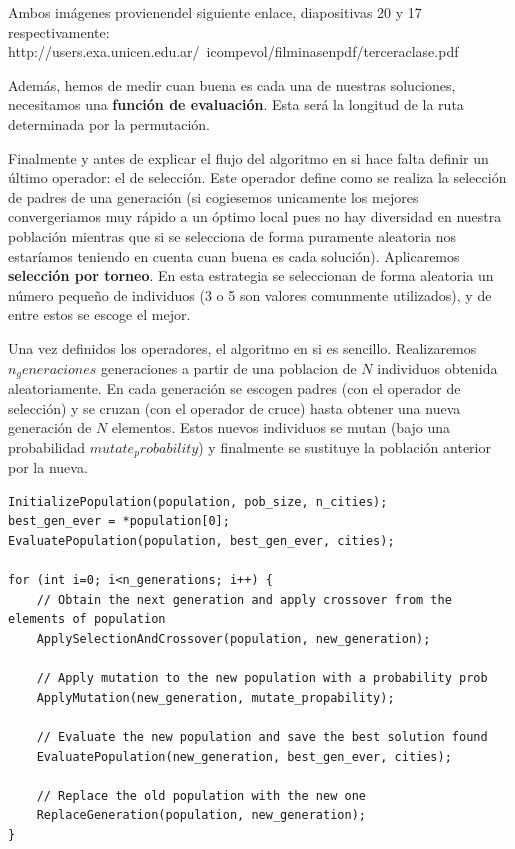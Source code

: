 \documentclass{article}
\begin{document}
Ambos imágenes provienendel siguiente enlace, diapositivas 20 y 17 respectivamente:
http://users.exa.unicen.edu.ar/~icompevol/filminasenpdf/terceraclase.pdf

Además, hemos de medir cuan buena es cada una de nuestras soluciones, necesitamos una \textbf{función de evaluación}. Esta será la longitud de la ruta determinada por la permutación.

Finalmente y antes de explicar el flujo del algoritmo en si hace falta definir un último operador: el de selección. Este operador define como se realiza la selección de padres de una generación (si cogiesemos unicamente los mejores convergeriamos muy rápido a un óptimo local pues no hay diversidad en nuestra población mientras que si se selecciona de forma puramente aleatoria nos estaríamos teniendo en cuenta cuan buena es cada solución). Aplicaremos \textbf{selección por torneo}. En esta estrategia se seleccionan de forma aleatoria un número pequeño de individuos (3 o 5 son valores comunmente utilizados), y de entre estos se escoge el mejor.

Una vez definidos los operadores, el algoritmo en si es sencillo. Realizaremos $n_generaciones$ generaciones a partir de una poblacion de $N$ individuos obtenida aleatoriamente. En cada generación se escogen padres (con el operador de selección) y se cruzan (con el operador de cruce) hasta obtener una nueva generación de $N$ elementos. Estos nuevos individuos se mutan (bajo una probabilidad $mutate_probability$) y finalmente se sustituye la población anterior por la nueva.

\begin{lstlisting}
InitializePopulation(population, pob_size, n_cities);
best_gen_ever = *population[0];
EvaluatePopulation(population, best_gen_ever, cities);

for (int i=0; i<n_generations; i++) {
	// Obtain the next generation and apply crossover from the elements of population
	ApplySelectionAndCrossover(population, new_generation);
	
	// Apply mutation to the new population with a probability prob
	ApplyMutation(new_generation, mutate_propability);
	
	// Evaluate the new population and save the best solution found
	EvaluatePopulation(new_generation, best_gen_ever, cities);
	
	// Replace the old population with the new one
	ReplaceGeneration(population, new_generation);
}
\end{lstlisting}
\end{document}

